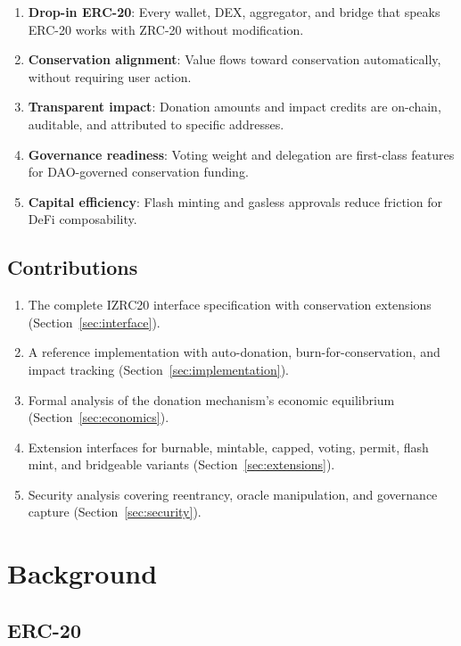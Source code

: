 \documentclass[11pt,letterpaper]{article}
\begin{document}
\begin{enumerate}
    \item \textbf{Drop-in ERC-20}: Every wallet, DEX, aggregator, and bridge that speaks ERC-20 works with ZRC-20 without modification.
    \item \textbf{Conservation alignment}: Value flows toward conservation automatically, without requiring user action.
    \item \textbf{Transparent impact}: Donation amounts and impact credits are on-chain, auditable, and attributed to specific addresses.
    \item \textbf{Governance readiness}: Voting weight and delegation are first-class features for DAO-governed conservation funding.
    \item \textbf{Capital efficiency}: Flash minting and gasless approvals reduce friction for DeFi composability.
\end{enumerate}

\subsection{Contributions}

\begin{enumerate}
    \item The complete IZRC20 interface specification with conservation extensions (Section~\ref{sec:interface}).
    \item A reference implementation with auto-donation, burn-for-conservation, and impact tracking (Section~\ref{sec:implementation}).
    \item Formal analysis of the donation mechanism's economic equilibrium (Section~\ref{sec:economics}).
    \item Extension interfaces for burnable, mintable, capped, voting, permit, flash mint, and bridgeable variants (Section~\ref{sec:extensions}).
    \item Security analysis covering reentrancy, oracle manipulation, and governance capture (Section~\ref{sec:security}).
\end{enumerate}

\section{Background}

\subsection{ERC-20}
\end{document}
